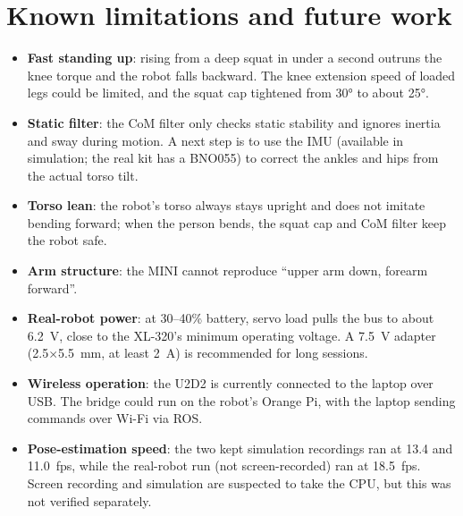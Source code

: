 \documentclass[11pt,a4paper]{article}
\begin{document}
\section{Known limitations and future work}
\label{sec:limits}
\begin{itemize}
  \item \textbf{Fast standing up}: rising from a deep squat in under a second outruns the knee torque and the robot falls backward. The knee extension speed of loaded legs could be limited, and the squat cap tightened from 30° to about 25°.
  \item \textbf{Static filter}: the CoM filter only checks static stability and ignores inertia and sway during motion. A next step is to use the IMU (available in simulation; the real kit has a BNO055) to correct the ankles and hips from the actual torso tilt.
  \item \textbf{Torso lean}: the robot's torso always stays upright and does not imitate bending forward; when the person bends, the squat cap and CoM filter keep the robot safe.
  \item \textbf{Arm structure}: the MINI cannot reproduce ``upper arm down, forearm forward''.
  \item \textbf{Real-robot power}: at 30--40\% battery, servo load pulls the bus to about 6.2~V, close to the XL-320's minimum operating voltage. A 7.5~V adapter (2.5$\times$5.5~mm, at least 2~A) is recommended for long sessions.
  \item \textbf{Wireless operation}: the U2D2 is currently connected to the laptop over USB. The bridge could run on the robot's Orange Pi, with the laptop sending commands over Wi-Fi via ROS.
  \item \textbf{Pose-estimation speed}: the two kept simulation recordings ran at 13.4 and 11.0~fps, while the real-robot run (not screen-recorded) ran at 18.5~fps. Screen recording and simulation are suspected to take the CPU, but this was not verified separately.
\end{itemize}

\end{document}
